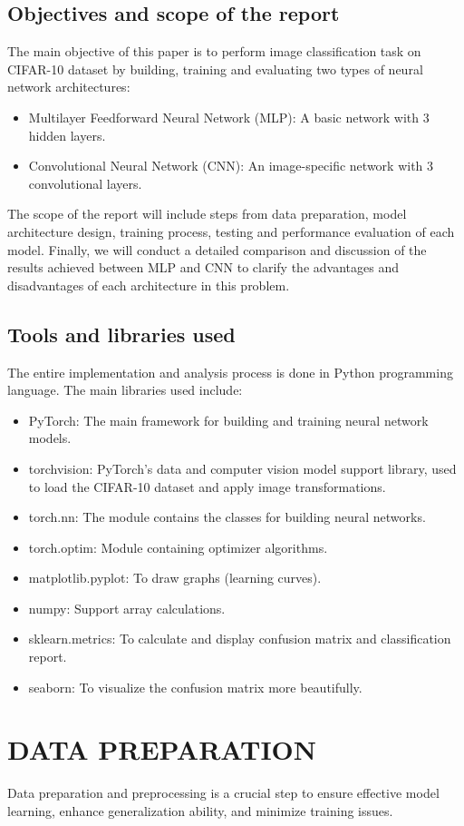 \documentclass[12pt]{article}
\begin{document}
\subsection{Objectives and scope of the report}
The main objective of this paper is to perform image classification task on CIFAR-10 dataset by building, training and evaluating two types of neural network architectures:
\begin{itemize}
    \item Multilayer Feedforward Neural Network (MLP): A basic network with 3 hidden layers.
    \item Convolutional Neural Network (CNN): An image-specific network with 3 convolutional layers.
\end{itemize}
The scope of the report will include steps from data preparation, model architecture design, training process, testing and performance evaluation of each model. Finally, we will conduct a detailed comparison and discussion of the results achieved between MLP and CNN to clarify the advantages and disadvantages of each architecture in this problem.

\subsection{Tools and libraries used}
The entire implementation and analysis process is done in Python programming language. The main libraries used include:
\begin{itemize}
    \item PyTorch: The main framework for building and training neural network models.
    \item torchvision: PyTorch's data and computer vision model support library, used to load the CIFAR-10 dataset and apply image transformations.
    \item torch.nn: The module contains the classes for building neural networks.
    \item torch.optim: Module containing optimizer algorithms.
    \item matplotlib.pyplot: To draw graphs (learning curves).
    \item numpy: Support array calculations.
    \item sklearn.metrics: To calculate and display confusion matrix and classification report.
    \item seaborn: To visualize the confusion matrix more beautifully.
\end{itemize}

\section{DATA PREPARATION}
Data preparation and preprocessing is a crucial step to ensure effective model learning, enhance generalization ability, and minimize training issues.
\end{document}
